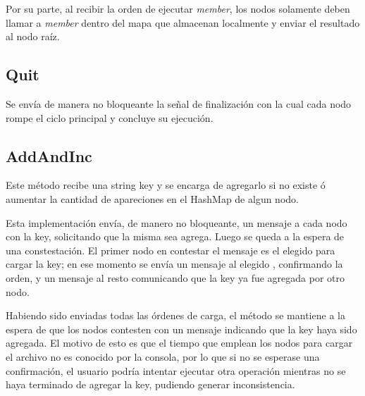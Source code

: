 Por su parte, al recibir la orden de ejecutar \textit{member}, los nodos
solamente deben llamar a \textit{member} dentro del mapa que almacenan
localmente y enviar el resultado al nodo raíz.

\subsection{Quit}

Se envía de manera no bloqueante la señal de finalización con la cual cada
nodo rompe el ciclo principal y concluye su ejecución.

\subsection{AddAndInc}

Este método recibe una string key y se encarga de agregarlo si no existe ó
aumentar la cantidad de apareciones en el HashMap de algun nodo.

Esta implementación envía, de manero no bloqueante, un mensaje a cada nodo con
la key, solicitando que la misma sea agrega. Luego se queda a la espera de una
constestación.  El primer nodo en contestar el mensaje es el elegido para
cargar la key; en ese momento se envía un mensaje al elegido , confirmando
la orden, y un mensaje al resto comunicando que la key ya fue agregada por
otro  nodo.

Habiendo sido enviadas todas las órdenes de carga, el método se mantiene a la
espera de que los nodos contesten con un mensaje indicando que la key haya
sido agregada. El motivo de esto es que el tiempo que emplean los nodos para
cargar el archivo no es conocido por la consola, por lo que si no se esperase
una confirmación, el usuario podría intentar ejecutar otra operación mientras
no se haya terminado de agregar la key, pudiendo generar inconsistencia.

